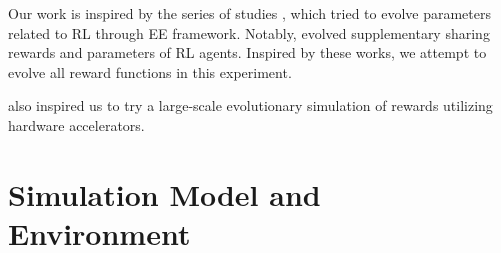 Our work is inspired by the series of studies \citep{elfwingBiologicallyInspiredEmbodied2005,elfwingDarwinianEmbodiedEvolution2011,elfwingEmergencePolymorphicMating2014}, which tried to evolve parameters related to RL through EE framework. Notably, \citet{elfwingDarwinianEmbodiedEvolution2011} evolved supplementary sharing rewards and parameters of RL agents.
Inspired by these works, we attempt to evolve all reward functions in this experiment.

\citet{zhengWhatCanLearned2020} also inspired us to try a large-scale evolutionary simulation of rewards utilizing hardware accelerators.

\section{Simulation Model and Environment}\label{sec:method}


